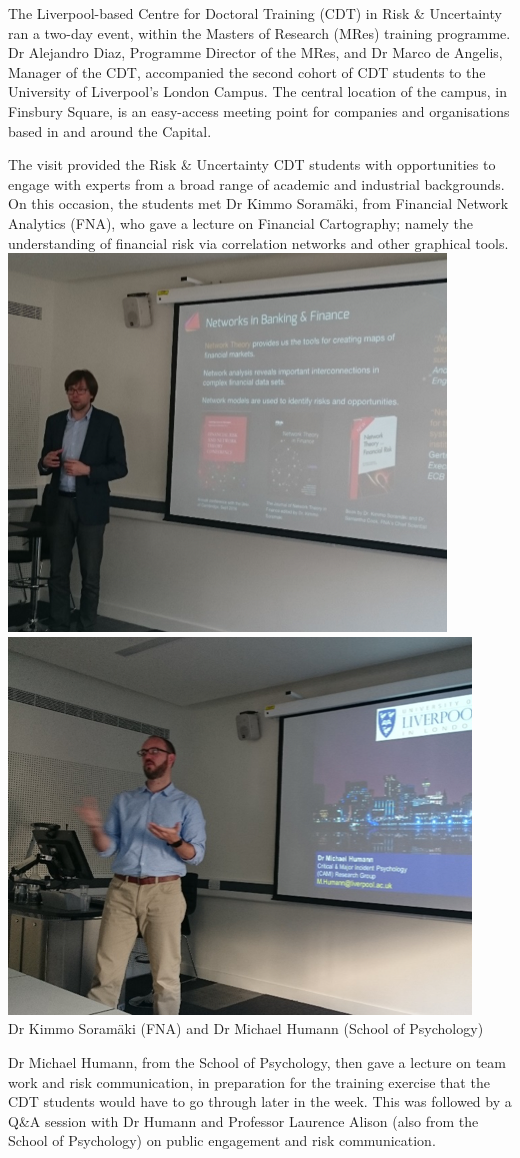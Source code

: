 \documentclass[11pt]{article}%
\begin{document}
\begin{minipage}{1.\textwidth}
\begin{multicols}{2}
The Liverpool-based Centre for Doctoral Training (CDT) in Risk \& Uncertainty ran a two-day event, within the Masters of Research (MRes) training programme. Dr Alejandro Diaz, Programme Director of the MRes, and Dr Marco de Angelis, Manager of the CDT, accompanied the second cohort of CDT students to the University of Liverpool’s London Campus. The central location of the campus, in Finsbury Square, is an easy-access meeting point for companies and organisations based in and around the Capital.

The visit provided the Risk & Uncertainty CDT students with opportunities to engage with experts from a broad range of academic and industrial backgrounds. On this occasion, the students met Dr Kimmo Soram{\"a}ki, from Financial Network Analytics (FNA), who gave a lecture on Financial Cartography; namely the understanding of financial risk via correlation networks and other graphical tools.\\
\includegraphics[width=0.48\linewidth]{training/Picture1.png}
\includegraphics[width=0.51\linewidth]{training/Picture2.png}\\
{\footnotesize Dr Kimmo Soram{\"a}ki (FNA) and Dr Michael Humann (School of Psychology)}

Dr Michael Humann, from the School of Psychology, then gave a lecture on team work and risk communication, in preparation for the training exercise that the CDT students would have to go through later in the week. This was followed by a Q&A session with Dr Humann and Professor Laurence Alison (also from the School of Psychology) on public engagement and risk communication.


\end{multicols}
\end{minipage}
\end{document}
